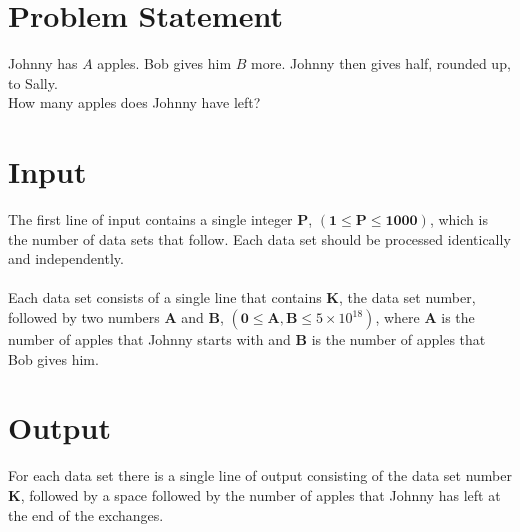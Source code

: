 \documentclass[a4paper,11pt,oneside]{article}
\begin{document}
\pagestyle{fancy}



\section{Problem Statement}
Johnny has $A$ apples. Bob gives him $B$ more. Johnny then gives half, rounded up, to Sally.\\
How many apples does Johnny have left?

\section{Input}
The first line of input contains a single integer $\boldsymbol{P}$,
$(\boldsymbol{1} \le \boldsymbol{P} \le \boldsymbol{1000})$, which is the
number of data sets that follow. Each data set should be processed identically
and independently.
\\\\
Each data set consists of a single line that contains $\boldsymbol{K}$, the data
set number, followed by two numbers $\boldsymbol{A}$ and $\boldsymbol{B}$,
$(\boldsymbol{0} \le \boldsymbol{A}, \boldsymbol{B} \le 5 \times 10^{18})$, where
$\boldsymbol{A}$ is the number of apples that Johnny starts with and $\boldsymbol{B}$ is
the number of apples that Bob gives him.


\section{Output}
For each data set there is a single line of output consisting of the data set number $\boldsymbol{K}$,
followed by a space followed by the number of apples that Johnny has left at the end of the exchanges.
\end{document}
